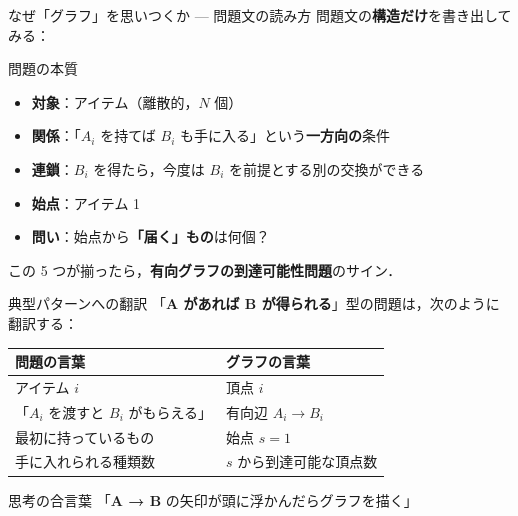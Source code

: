 \documentclass[dvipdfmx,aspectratio=169]{beamer}
\begin{document}
\begin{frame}{なぜ「グラフ」を思いつくか --- 問題文の読み方}
  問題文の\textbf{構造だけ}を書き出してみる：

  \vspace{0.6em}
  \begin{block}{問題の本質}
    \begin{itemize}
      \item \textbf{対象}：アイテム（離散的，$N$ 個）
      \item \textbf{関係}：「$A_i$ を持てば $B_i$ も手に入る」という\textbf{一方向の}条件
      \item \textbf{連鎖}：$B_i$ を得たら，今度は $B_i$ を前提とする別の交換ができる
      \item \textbf{始点}：アイテム 1
      \item \textbf{問い}：始点から\textbf{「届く」もの}は何個？
    \end{itemize}
  \end{block}

  \vspace{0.6em}
  この 5 つが揃ったら，\textbf{有向グラフの到達可能性問題}のサイン．
\end{frame}

\begin{frame}{典型パターンへの翻訳}
  「\textbf{A があれば B が得られる}」型の問題は，次のように翻訳する：

  \vspace{0.8em}
  \begin{center}
    \begin{tabular}{ll}
      \toprule
      問題の言葉 & グラフの言葉 \\
      \midrule
      アイテム $i$ & 頂点 $i$ \\
      「$A_i$ を渡すと $B_i$ がもらえる」 & 有向辺 $A_i \to B_i$ \\
      最初に持っているもの & 始点 $s = 1$ \\
      手に入れられる種類数 & $s$ から到達可能な頂点数 \\
      \bottomrule
    \end{tabular}
  \end{center}

  \vspace{0.8em}
  \begin{block}{思考の合言葉}
    「\textbf{A → B} の矢印が頭に浮かんだらグラフを描く」
  \end{block}
\end{frame}
\end{document}
